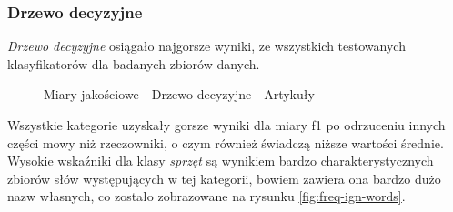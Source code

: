 \subsubsection{Drzewo decyzyjne}
\textit{Drzewo decyzyjne} osiągało najgorsze wyniki, ze wszystkich testowanych klasyfikatorów dla badanych zbiorów danych.
\begin{figure}[ht!]
	\centering
    \qquad
	\caption{Miary jakościowe - Drzewo decyzyjne - Artykuły}
    \label{fig:report-dt-articles}
\end{figure}

Wszystkie kategorie uzyskały gorsze wyniki dla miary f1 po odrzuceniu innych części mowy niż rzeczowniki, o czym również świadczą niższe wartości średnie. Wysokie wskaźniki dla klasy \textit{sprzęt} są wynikiem bardzo charakterystycznych zbiorów słów występujących w tej kategorii, bowiem zawiera ona bardzo dużo nazw własnych, co zostało zobrazowane na rysunku \ref{fig:freq-ign-words}.

